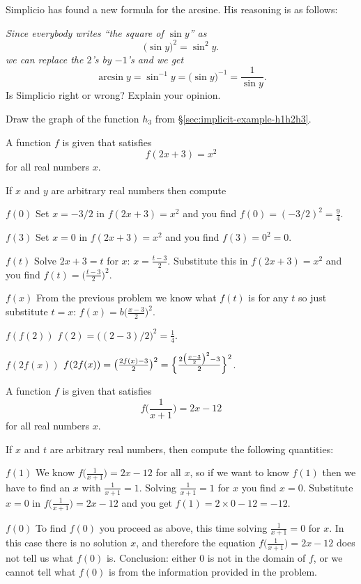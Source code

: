 \begin{multicols}{2}
\problem Simplicio has found a new formula for the arcsine.  His reasoning
is as follows:

{\itshape
Since everybody writes ``the square of $\sin y$'' as
\[
\bigl(\sin y\bigr)^2 = \sin^2 y.
\]
we can replace the $2$'s by $-1$'s and we get
\[
\arcsin y = \sin^{-1}y
=
\bigl(\sin y\bigr)^{-1} = \frac 1{\sin y}.
\]}%
Is Simplicio right or wrong?  Explain your opinion.



\problem Draw the graph of the function $h_3$ from
\S\ref{sec:implicit-example-h1h2h3}.


\problem A function $f$ is given that satisfies
\[
f(2x+3) = x^2
\]
for all real numbers $x$.

If $x$ and $y$ are arbitrary real numbers
then compute

\subprob $f(0)$
\answer
Set $x=-3/2$ in $f(2x+3) = x^2$ and you find $f(0) = (-3/2)^2 =
\frac{9}{4}$.
\endanswer

\subprob $f(3)$
\answer
Set $x=0$ in $f(2x+3) = x^2$ and you find $f(3) = 0^2 = 0$.
\endanswer

\subprob $f(t)$
\answer
Solve $2x+3 = t$ for $x$:  $x=\frac{t-3}{2}$.  Substitute this in $f(2x+3) =
x^2$ and you find $f(t) = \bigl(\frac{t-3}{2}\bigr)^2$.
\endanswer

\subprob $f(x)$
\answer
From the previous problem we know what $f(t)$ is for any $t$ so just substitute $t=x$:
$f(x)= b\bigl(\frac{x-3}{2}\bigr)^2$.

\endanswer
\subprob $f(f(2))$
\answer
$f(2) = \bigl((2-3)/2\bigr)^2 = \frac{1}{4}$.
\endanswer

\subprob $f(2f(x))$
\answer
$f(2f(x)) = \bigl(\frac{2f(x)-3}{2}\bigr)^2 =
\Bigl\{\frac{2\bigl(\frac{x-3}{2}\bigr)^2 - 3}{2}\Bigr\}^2$.

\endanswer



\problem A function $f$ is given that satisfies
\[
f\bigl(\frac1{x+1}\bigr) = 2x-12
\]
for all real numbers $x$.

If $x$ and $t$ are arbitrary real numbers, then 
compute the following quantities:

\subprob $f(1)$
\answer
We know $f\bigl(\frac1{x+1}\bigr) = 2x-12$ for all $x$, so if we want to know
$f(1)$ then we have to find an $x$ with $\frac{1}{x+1} = 1$.  Solving $\frac{1}{x+1} = 1$
for $x$ you find $x=0$. Substitute $x=0$ in $f\bigl(\frac1{x+1}\bigr) = 2x-12$
and you get $f(1) = 2\times0-12 = -12$.
\endanswer

\subprob $f(0)$
\answer
To find $f(0)$ you proceed as above, this time solving $\frac{1}{x+1} = 0$ for
$x$.  In this case there is no solution $x$, and therefore the equation 
$f\bigl(\frac1{x+1}\bigr) = 2x-12$ does not tell us what $f(0)$ is.  Conclusion:
either 0 is not in the domain of $f$, or we cannot tell what $f(0)$ is from
the  information provided in the problem. 
\endanswer


\end{multicols}
